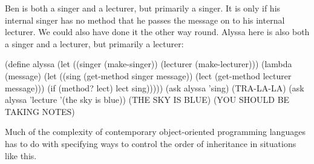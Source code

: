 Ben is both a singer and a lecturer, but primarily a singer.  It is only
if his internal singer has no method that he passes the message on to
his internal lecturer.  We could also have done it the other way round.
Alyssa here is also both a singer and a lecturer, but primarily a lecturer:

\beginlisp
(define alyssa
  (let ((singer (make-singer))
        (lecturer (make-lecturer)))
    (lambda (message)
      (let ((sing (get-method singer message))
           (lect (get-method lecturer message)))
        (if (method? lect)
            lect
            sing)))))
\null
(ask alyssa 'sing)
(TRA-LA-LA)
\null
(ask alyssa 'lecture '(the sky is blue))
(THE SKY IS BLUE)
(YOU SHOULD BE TAKING NOTES)
\null
\endlisp

Much of the complexity of contemporary object-oriented programming
languages has to do with specifying ways to control the order of
inheritance in situations like this.


